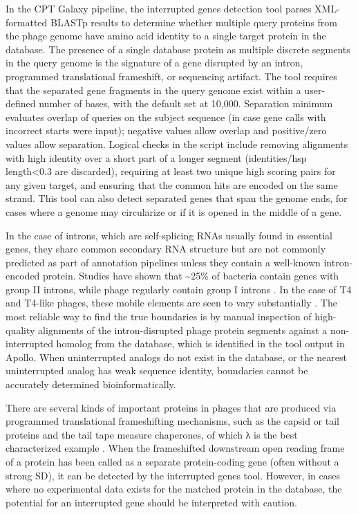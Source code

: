 In the CPT Galaxy pipeline, the interrupted genes detection tool parses
XML-formatted BLASTp results to determine whether multiple query
proteins from the phage genome have amino acid identity to a single
target protein in the database. The presence of a single database
protein as multiple discrete segments in the query genome is the
signature of a gene disrupted by an intron, programmed translational
frameshift, or sequencing artifact. The tool requires that the separated
gene fragments in the query genome exist within a user-defined number of
bases, with the default set at 10,000. Separation minimum evaluates
overlap of queries on the subject sequence (in case gene calls with
incorrect starts were input); negative values allow overlap and
positive/zero values allow separation. Logical checks in the script
include removing alignments with high identity over a short part of a
longer segment (identities/hsp length\textless0.3 are discarded),
requiring at least two unique high scoring pairs for any given target,
and ensuring that the common hits are encoded on the same strand. This
tool can also detect separated genes that span the genome ends, for
cases where a genome may circularize or if it is opened in the middle of
a gene.

In the case of introns, which are self-splicing RNAs usually found in
essential genes, they share common secondary RNA structure but are not
commonly predicted as part of annotation pipelines unless they contain a
well-known intron-encoded protein. Studies have shown that
\textasciitilde25\% of bacteria contain genes with group II introns,
while phage regularly contain group I introns \cite{Lambowitz_2010,Candales_2011,Leclercq_2012}. In the case
of T4 and T4-like phages, these mobile elements are seen to vary
substantially \cite{Edgell_2010,Petrov_2006,Petrov_2010}. The most reliable way to find the true
boundaries is by manual inspection of high-quality alignments of the
intron-disrupted phage protein segments against a non-interrupted
homolog from the database, which is identified in the tool output in
Apollo. When uninterrupted analogs do not exist in the database, or the
nearest uninterrupted analog has weak sequence identity, boundaries
cannot be accurately determined bioinformatically.

There are several kinds of important proteins in phages that are
produced via programmed translational frameshifting mechanisms, such as
the capsid or tail proteins and the tail tape measure chaperones, of
which λ is the best characterized example \cite{Baranov_2006,Atkins_2016,Xu_2004,Garci_a_2004,Auzat_2008,Condron_1991}. When the
frameshifted downstream open reading frame of a protein has been called
as a separate protein-coding gene (often without a strong SD), it can be
detected by the interrupted genes tool. However, in cases where no
experimental data exists for the matched protein in the database, the
potential for an interrupted gene should be interpreted with caution.

